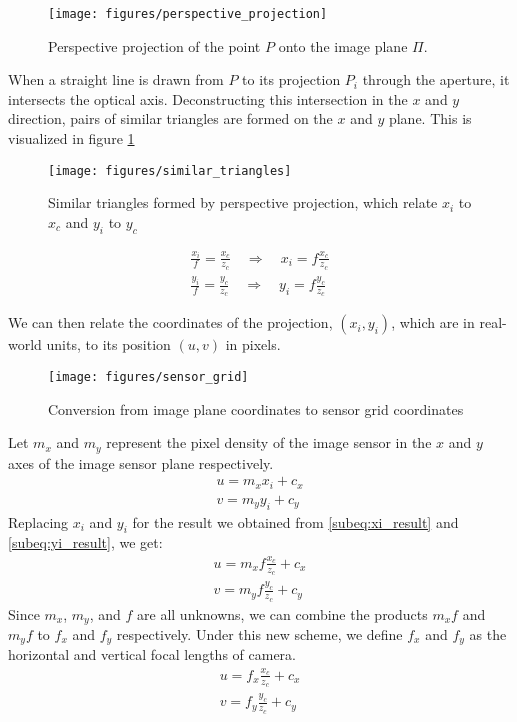 \begin{figure}[H]
    \centering
    \texttt{[image: figures/perspective\_projection]}
    \caption{Perspective projection of the point $P$ onto the image plane $\Pi$.}
\end{figure}

When a straight line is drawn from $P$ to its projection $P_i$ through the aperture, it intersects the optical axis. Deconstructing this intersection in the $x$ and $y$ direction, pairs of similar triangles are formed on the $x$ and $y$ plane. This is visualized in figure \ref{fig:similar_triangles}
\begin{figure}[H] \label{fig:similar_triangles}
    \centering
    \texttt{[image: figures/similar\_triangles]}
    \caption{Similar triangles formed by perspective projection, which relate $x_i$ to $x_c$ and $y_i$ to $y_c$}
\end{figure}

\begin{subequations}
    \begin{gather}
        \frac{x_i}{f} = \frac{x_c}{z_c} \quad \Longrightarrow \quad x_i = f \frac{x_c}{z_c} \label{subeq:xi_result}\\
        \frac{y_i}{f} = \frac{y_c}{z_c} \quad \Longrightarrow \quad y_i = f \frac{y_c}{z_c} \label{subeq:yi_result}
    \end{gather}
\end{subequations}

We can then relate the coordinates of the projection, $(x_i, y_i)$, which are in real-world units, to its position $(u, v)$ in pixels.
\begin{figure}[H]
    \centering
    \texttt{[image: figures/sensor\_grid]}
    \caption{Conversion from image plane coordinates to sensor grid coordinates}
\end{figure}
Let $m_x$ and $m_y$ represent the pixel density of the image sensor in the $x$ and $y$ axes of the image sensor plane respectively.
\begin{align*}
    u = m_x x_i + c_x \\
    v = m_y y_i + c_y
\end{align*}
Replacing $x_i$ and $y_i$ for the result we obtained from \ref{subeq:xi_result} and \ref{subeq:yi_result}, we get:
\begin{align*}
    u = m_x f \frac{x_c}{z_c} + c_x \\
    v = m_y f \frac{y_c}{z_c} + c_y
\end{align*}
Since $m_x$, $m_y$, and $f$ are all unknowns, we can combine the products $m_x f$ and $m_y f$ to $f_x$ and $f_y$ respectively. Under this new scheme, we define $f_x$ and $f_y$ as the horizontal and vertical focal lengths of camera.
\begin{subequations}
    \begin{gather}
        u = f_x \frac{x_c}{z_c} + c_x \\
        v = f_y \frac{y_c}{z_c} + c_y
    \end{gather}
\end{subequations}

